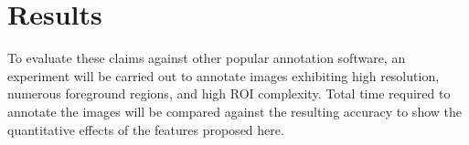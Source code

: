 \section{Results}
To evaluate these claims against other popular annotation software, an experiment will be carried out to annotate images exhibiting high resolution, numerous foreground regions, and high ROI complexity. Total time required to annotate the images will be compared against the resulting accuracy to show the quantitative effects of the features proposed here.